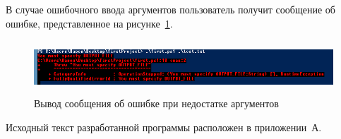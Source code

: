 В случае ошибочного ввода аргументов пользователь получит сообщение об ошибке,
представленное на рисунке~\ref{fig:error}.

\begin{figure}[h!]
  \centering
  \includegraphics[width=150mm,height=20mm]{img/error}
  \caption{Вывод сообщения об ошибке при недостатке аргументов}\label{fig:error}
\end{figure}

Исходный текст разработанной программы расположен в приложении~А.

\newpage
